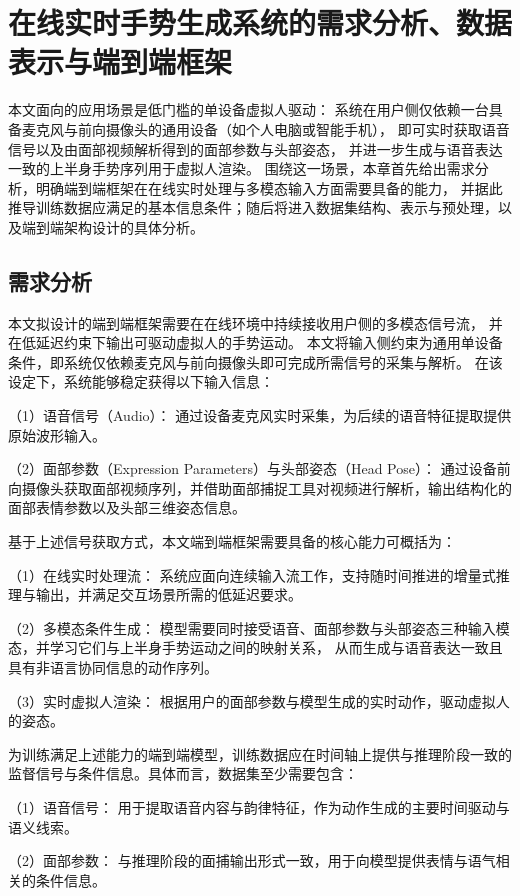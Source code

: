 \chapter{在线实时手势生成系统的需求分析、数据表示与端到端框架}
\label{chap:framework}

本文面向的应用场景是低门槛的单设备虚拟人驱动：
系统在用户侧仅依赖一台具备麦克风与前向摄像头的通用设备（如个人电脑或智能手机），
即可实时获取语音信号以及由面部视频解析得到的面部参数与头部姿态，
并进一步生成与语音表达一致的上半身手势序列用于虚拟人渲染。
围绕这一场景，本章首先给出需求分析，明确端到端框架在在线实时处理与多模态输入方面需要具备的能力，
并据此推导训练数据应满足的基本信息条件；随后将进入数据集结构、表示与预处理，以及端到端架构设计的具体分析。

\section{需求分析}
\label{sec:requirement_analysis_v2}

本文拟设计的端到端框架需要在在线环境中持续接收用户侧的多模态信号流，
并在低延迟约束下输出可驱动虚拟人的手势运动。
本文将输入侧约束为通用单设备条件，即系统仅依赖麦克风与前向摄像头即可完成所需信号的采集与解析。
在该设定下，系统能够稳定获得以下输入信息：  

（1）语音信号（Audio）：
通过设备麦克风实时采集，为后续的语音特征提取提供原始波形输入。

（2）面部参数（Expression Parameters）与头部姿态（Head Pose）：
通过设备前向摄像头获取面部视频序列，并借助面部捕捉工具对视频进行解析，输出结构化的面部表情参数以及头部三维姿态信息。

基于上述信号获取方式，本文端到端框架需要具备的核心能力可概括为：

（1）在线实时处理流：
系统应面向连续输入流工作，支持随时间推进的增量式推理与输出，并满足交互场景所需的低延迟要求。

（2）多模态条件生成：
模型需要同时接受语音、面部参数与头部姿态三种输入模态，并学习它们与上半身手势运动之间的映射关系，
从而生成与语音表达一致且具有非语言协同信息的动作序列。

（3）实时虚拟人渲染：
根据用户的面部参数与模型生成的实时动作，驱动虚拟人的姿态。

为训练满足上述能力的端到端模型，训练数据应在时间轴上提供与推理阶段一致的监督信号与条件信息。具体而言，数据集至少需要包含：

（1）语音信号：
用于提取语音内容与韵律特征，作为动作生成的主要时间驱动与语义线索。

（2）面部参数：
与推理阶段的面捕输出形式一致，用于向模型提供表情与语气相关的条件信息。

